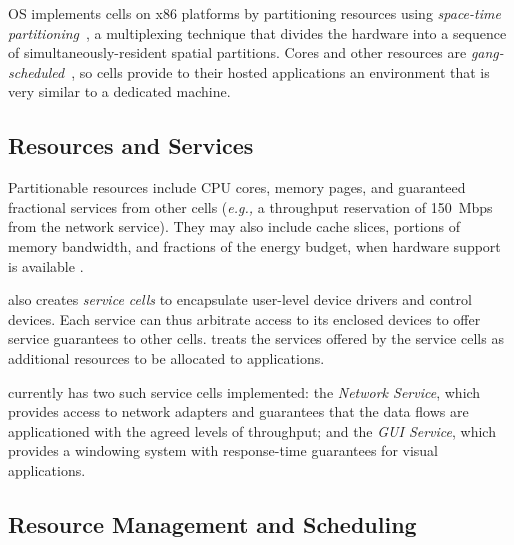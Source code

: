 \tess OS implements cells on x86 platforms by partitioning resources
using \emph{space-time partitioning}~\cite{rushby99,lei03}, 
a multiplexing technique that divides the hardware into a sequence of
simultaneously-resident spatial partitions. 
Cores and other resources are
\textit{gang-scheduled}~\cite{gangsched1982,gangschedpatent}, so
cells provide to their hosted applications an environment that is very
similar to a dedicated machine.

\subsection{Resources and Services} \label{sec:soa} 
Partitionable resources include CPU cores, memory pages, and guaranteed
fractional services from other cells (\emph{e.g.,} a throughput reservation of 150~Mbps
from the network service).  
They may also include cache slices, portions of memory bandwidth, and fractions
of the energy budget, when hardware support is available
\cite{akesson07,lee08memqos,paolieri09,sanchez11}.

\tess also creates \emph{service cells} to encapsulate user-level device drivers and control devices.
Each service can thus arbitrate access to its
enclosed devices to offer service guarantees to
other cells. \tess treats the services
offered by the service cells as additional resources to be allocated to applications.

\tess currently has two such service cells implemented:
the \emph{Network Service}, which provides access to network adapters and
guarantees that the data flows are applicationed with the agreed levels of
throughput; and the \emph{GUI Service}, which provides a windowing system with
response-time guarantees for visual applications.  


\subsection{Resource Management and Scheduling} 

